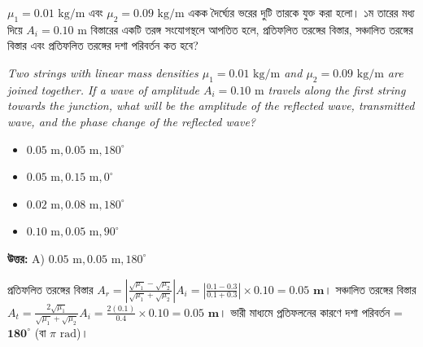 \documentclass[12pt, a4paper]{article}
\begin{document}
\begin{tcolorbox}[questionbox={প্রশ্ন (Question) 9}]
    \noindent
    $\mu_1 = 0.01\text{ kg/m}$ এবং $\mu_2 = 0.09\text{ kg/m}$ একক দৈর্ঘ্যের ভরের দুটি তারকে যুক্ত করা হলো। ১ম তারের মধ্য দিয়ে $A_i = 0.10\text{ m}$ বিস্তারের একটি তরঙ্গ সংযোগস্থলে আপতিত হলে, প্রতিফলিত তরঙ্গের বিস্তার, সঞ্চালিত তরঙ্গের বিস্তার এবং প্রতিফলিত তরঙ্গের দশা পরিবর্তন কত হবে?
    
    \vspace{0.8em}
    \begin{english}
    \noindent\textit{\color{darkgray}
    Two strings with linear mass densities $\mu_1 = 0.01\text{ kg/m}$ and $\mu_2 = 0.09\text{ kg/m}$ are joined together. If a wave of amplitude $A_i = 0.10\text{ m}$ travels along the first string towards the junction, what will be the amplitude of the reflected wave, transmitted wave, and the phase change of the reflected wave?
    }
    \end{english}
\end{tcolorbox}

\begin{itemize}[label={}, leftmargin=1cm, itemsep=0.5em]
    \item[\textbf{A)}] $0.05\text{ m}, 0.05\text{ m}, 180^\circ$
    \item[\textbf{B)}] $0.05\text{ m}, 0.15\text{ m}, 0^\circ$
    \item[\textbf{C)}] $0.02\text{ m}, 0.08\text{ m}, 180^\circ$
    \item[\textbf{D)}] $0.10\text{ m}, 0.05\text{ m}, 90^\circ$
\end{itemize}

\vspace{0.5em}
\begin{tcolorbox}[answerbox]
    \textbf{\color{success} উত্তর:} A) $0.05\text{ m}, 0.05\text{ m}, 180^\circ$
\end{tcolorbox}
\vspace{1em}

\begin{tcolorbox}[solutionbox={সমাধান (Solution)}]
    \noindent
    প্রতিফলিত তরঙ্গের বিস্তার $A_r = \left|\frac{\sqrt{\mu_1} - \sqrt{\mu_2}}{\sqrt{\mu_1} + \sqrt{\mu_2}}\right| A_i = \left|\frac{0.1 - 0.3}{0.1 + 0.3}\right| \times 0.10 = \mathbf{0.05\text{ m}}$। সঞ্চালিত তরঙ্গের বিস্তার $A_t = \frac{2\sqrt{\mu_1}}{\sqrt{\mu_1} + \sqrt{\mu_2}} A_i = \frac{2(0.1)}{0.4} \times 0.10 = \mathbf{0.05\text{ m}}$। ভারী মাধ্যমে প্রতিফলনের কারণে দশা পরিবর্তন = $\mathbf{180^\circ}$ (বা $\pi\text{ rad}$)।
\end{tcolorbox}
\end{document}
